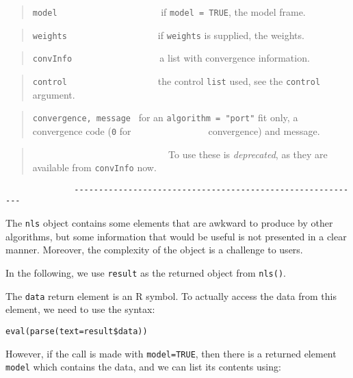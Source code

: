 \documentclass[
]{article}
\begin{document}
\begin{quote}
\texttt{model} ~ ~ ~ ~ ~ ~ ~ ~ ~ ~ ~ ~ ~if \texttt{model\ =\ TRUE}, the
model frame.
\end{quote}

\begin{quote}
\texttt{weights} ~ ~ ~ ~ ~ ~ ~ ~ ~ ~ ~ if \texttt{weights} is supplied,
the weights.
\end{quote}

\begin{quote}
\texttt{convInfo} ~ ~ ~ ~ ~ ~ ~ ~ ~ ~~ a list with convergence
information.
\end{quote}

\begin{quote}
\texttt{control} ~ ~ ~ ~ ~ ~ ~ ~ ~ ~ ~ the control \texttt{list} used,
see the \texttt{control} argument.
\end{quote}

\begin{quote}
\texttt{convergence,\ message} ~for an \texttt{algorithm\ =\ "port"} fit
only, a convergence code (\texttt{0} for \newline
\(~~~~~~~~~~~~~~~~~~~~~~~~~~~~~~~~~~~\)convergence) and message.
\end{quote}

\begin{quote}
~ ~ ~ ~ ~ ~ ~ ~ ~ ~ ~ ~ ~ ~ ~ ~ ~ To use these is \emph{deprecated}, as
they are available from \texttt{convInfo} now.
\end{quote}

\begin{verbatim}
              -----------------------------------------------------------
\end{verbatim}

The \texttt{nls} object contains some elements that are awkward to
produce by other algorithms, but some information that would be useful
is not presented in a clear manner. Moreover, the complexity of the
object is a challenge to users.

In the following, we use \texttt{result} as the returned object from
\texttt{nls()}.

The \texttt{data} return element is an R symbol. To actually access the
data from this element, we need to use the syntax:

\begin{verbatim}
eval(parse(text=result$data))
\end{verbatim}

However, if the call is made with \texttt{model=TRUE}, then there is a
returned element \texttt{model} which contains the data, and we can list
its contents using:
\end{document}

